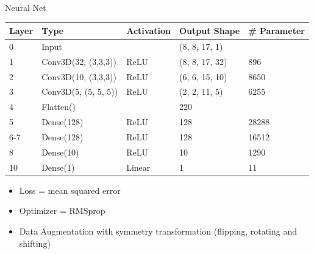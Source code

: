 \documentclass[10pt]{beamer}
\begin{document}
\begin{frame}{Neural Net}
  \centering
  \begin{tabular}{l|l|l|l|l}
    Layer & Type  & Activation & Output Shape & \# Parameter \\
    \hline
    0     & Input &            & (8, 8, 17, 1) &  \\
    1   & Conv3D(32, (3,3,3)) & ReLU & (8, 8, 17, 32)   & 896   \\
    2   & Conv3D(10, (3,3,3)) & ReLU & (6, 6, 15, 10)   & 8650  \\
    3   &  Conv3D(5, (5, 5, 5)) & ReLU & (2, 2, 11, 5)  & 6255  \\
    4     & Flatten()  & & 220 &               \\
    5   & Dense(128)                          & ReLU & 128 & 28288          \\
    6-7 & Dense(128)  & ReLU & 128 & 16512 \\
    8     & Dense(10)                           & ReLU & 10 & 1290         \\
    10     & Dense(1)                            & Linear   & 1 & 11 
  \end{tabular}
  \begin{itemize}
  \item Loss = mean squared error
  \item Optimizer = RMSprop
  \item Data Augmentation with symmetry transformation (flipping, rotating and shifting)
  \end{itemize}
\end{frame}
\end{document}
